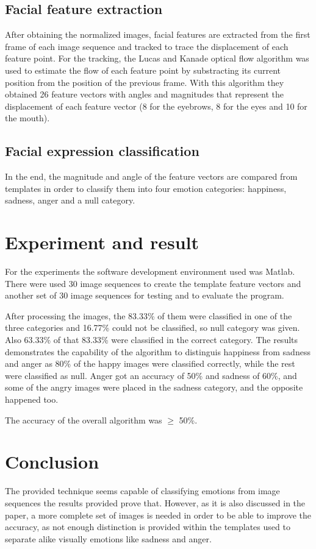 \documentclass[]{article}
\begin{document}
\subsection{Facial feature extraction}
After obtaining the normalized images, facial features are extracted from the first frame of each image sequence and tracked to trace the displacement of each feature point. For the tracking, the Lucas and Kanade optical flow algorithm \cite{lucas1981iterative} was used to estimate the flow of each feature point by substracting its current position from the position of the previous frame. With this algorithm they obtained 26 feature vectors with angles and magnitudes that represent the displacement of each feature vector (8 for the eyebrows, 8 for the eyes and 10 for the mouth).

\subsection{Facial expression classification}
\label{sc:methods}
In the end, the magnitude and angle of the feature vectors are compared from templates in order to classify them into four emotion categories: happiness, sadness, anger and a null category.

\newpage
\section{Experiment and result}
\label{sc:experiment}
For the experiments the software development environment used was Matlab. There were used 30 image sequences to create the template feature vectors and another set of 30 image sequences for testing and to evaluate the program.

After processing the images, the 83.33\% of them were classified in one of the three categories and 16.77\% could not be classified, so null category was given. Also 63.33\% of that 83.33\% were classified in the correct category.
The results demonstrates the capability of the algorithm to distinguis happiness from sadness and anger as 80\% of the happy images were classified correctly, while the rest were classified as null. Anger got an accuracy of 50\% and sadness of 60\%, and some of the angry images were placed in the sadness category, and the opposite happened too.

The accuracy of the overall algorithm was $\geq$ 50\%.

\section{Conclusion}
\label{sc:conclusion}
The provided technique seems capable of classifying emotions from image sequences the results provided prove that. However, as it is also discussed in the paper, a more complete set of images is needed in order to be able to improve the accuracy, as not enough distinction is provided within the templates used to separate alike visually emotions like sadness and anger.




\end{document}
